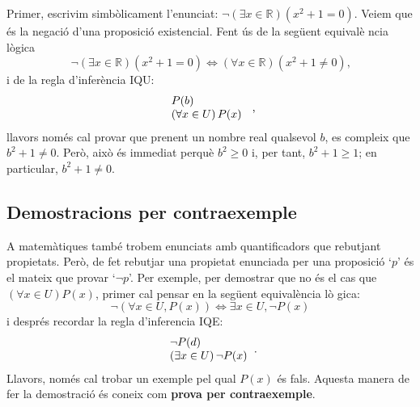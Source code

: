 \begin{solucio}
Primer, escrivim simb\`{o}licament l'enunciat: $\lnot\left( \exists x\in%
\mathbb{R}\right) \left( x^{2}+1=0\right) $. Veiem que \'{e}s la negaci\'{o}
d'una proposici\'{o} existencial. Fent \'{u}s de la seg\"{u}ent equival\`{e}%
ncia l\`{o}gica%
\begin{equation*}
\lnot\left( \exists x\in\mathbb{R}\right) \left( x^{2}+1=0\right)
\Longleftrightarrow\left( \forall x\in\mathbb{R}\right) \left(
x^{2}+1\neq0\right) \text{,}
\end{equation*}
i de la regla d'infer\`{e}ncia IQU:%
\begin{equation*}
\begin{tabular}{l}
$P(b)$ \\
$\left( \forall x\in U\right) P(x)$%
\end{tabular}
\ \text{,}
\end{equation*}
llavors nom\'{e}s cal provar que prenent un nombre real qualsevol $b$, es
compleix que $b^{2}+1\neq0$. Per\`{o}, aix\`{o} \'{e}s immediat perqu\`{e} $%
b^{2}\geq0$ i, per tant, $b^{2}+1\geq1$; en particular, $b^{2}+1\neq0$.
\end{solucio}

\subsection{Demostracions per contraexemple}

A matem\`{a}tiques tamb\'{e} trobem enunciats amb quantificadors que
rebutjant propietats. Per\`{o}, de fet rebutjar una propietat enunciada per
una proposici\'{o} `$p$' \'{e}s el mateix que provar `$\lnot p$'. Per
exemple, per demostrar que no \'{e}s el cas que $\left( \forall x\in
U\right) P(x)$, primer cal pensar en la seg\"{u}ent equival\`{e}ncia l\`{o}%
gica:%
\begin{equation*}
\lnot\left( \forall x\in U,P(x)\right) \Longleftrightarrow\exists x\in
U,\lnot P\left( x\right)
\end{equation*}
i despr\'{e}s recordar la regla d'inferencia IQE:%
\begin{equation*}
\begin{tabular}{l}
$\lnot P(d)$ \\
$\left( \exists x\in U\right) \lnot P(x)$%
\end{tabular}
\text{.}
\end{equation*}
Llavors, nom\'{e}s cal trobar un exemple pel qual $P(x)$ \'{e}s fals.
Aquesta manera de fer la demostraci\'{o} \'{e}s coneix com \textbf{prova per
contraexemple}.


